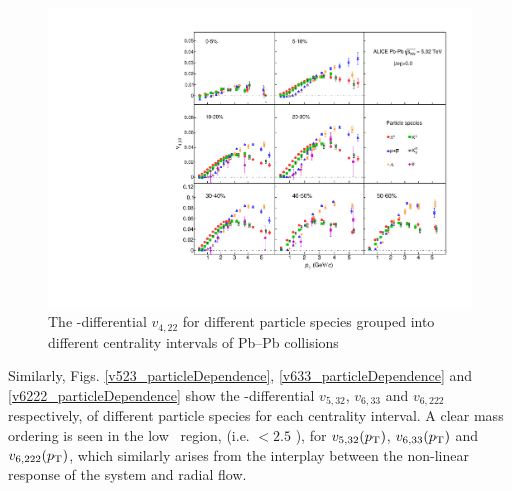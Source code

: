\begin{figure}[!htb]
\begin{center}
\includegraphics[scale=0.82]{figures/results/All_v422_gap00_PID2_3by3.pdf}
\end{center}
\caption{The \pT-differential $v_{4,22}$ for different particle species grouped into different centrality intervals of Pb--Pb collisions \sNN}
\label{v422_particleDependence}
\end{figure}

Similarly, Figs. \ref{v523_particleDependence}, \ref{v633_particleDependence} and \ref{v6222_particleDependence} show the \pT-differential $v_{5,32}$, $v_{6,33}$ and $v_{6,222}$ respectively, of different particle species for each centrality interval. A clear mass ordering is seen in the low \pT~region, (i.e. \pT $< 2.5$ \GeV), for $v_{5,32}(p_{\rm{T}})$, $v_{6,33}(p_{\rm{T}})$ and $v_{6,222}(p_{\rm{T}})$, which similarly arises from the interplay between the non-linear response of the system and radial flow. 

